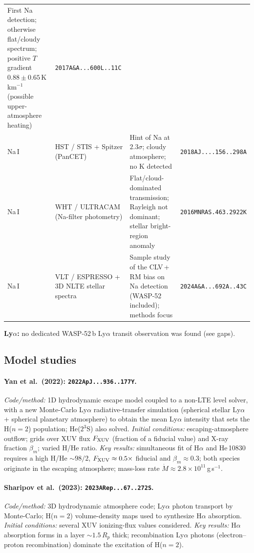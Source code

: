 \begin{longtable}{@{}p{2.0cm} p{2.8cm} p{5.3cm} p{2.9cm}@{}}
First Na detection; otherwise flat/cloudy spectrum; positive $T$ gradient
$0.88\pm0.65$\,K\,km$^{-1}$ (possible upper-atmosphere heating) &
{\footnotesize\texttt{2017A\&A...600L..11C}} \\
Na\,I & HST / STIS + Spitzer (PanCET) &
Hint of Na at $2.3\sigma$; cloudy atmosphere; no K detected &
{\footnotesize\texttt{2018AJ....156..298A}} \\
Na\,I & WHT / ULTRACAM (Na-filter photometry) &
Flat/cloud-dominated transmission; Rayleigh not dominant; stellar bright-region anomaly &
{\footnotesize\texttt{2016MNRAS.463.2922K}} \\
Na\,I & VLT / ESPRESSO + 3D NLTE stellar spectra &
Sample study of the CLV\,+\,RM bias on Na detection (WASP-52 included); methods focus &
{\footnotesize\texttt{2024A\&A...692A..43C}} \\
\bottomrule
\end{longtable}

\noindent\textbf{Ly$\alpha$:} no dedicated WASP-52\,b Ly$\alpha$ transit
observation was found (see gaps).

\subsection{Model studies}

\paragraph{Yan et al.\ (2022): \texttt{2022ApJ...936..177Y}.}
\emph{Code/method:} 1D hydrodynamic escape model coupled to a non-LTE level solver,
with a new Monte-Carlo Ly$\alpha$ radiative-transfer simulation (spherical stellar
Ly$\alpha$ + spherical planetary atmosphere) to obtain the mean Ly$\alpha$ intensity
that sets the H($n{=}2$) population; He($2^3$S) also solved.
\emph{Initial conditions:} escaping-atmosphere outflow; grids over XUV flux
$F_{\rm XUV}$ (fraction of a fiducial value) and X-ray fraction $\beta_m$; varied H/He
ratio.
\emph{Key results:} simultaneous fit of H$\alpha$ and He\,10830 requires a high H/He
$\sim98/2$, $F_{\rm XUV}\approx0.5\times$ fiducial and $\beta_m\approx0.3$; both species
originate in the escaping atmosphere; mass-loss rate
$\dot M\approx2.8\times10^{11}$\,g\,s$^{-1}$.

\paragraph{Sharipov et al.\ (2023): \texttt{2023ARep...67..272S}.}
\emph{Code/method:} 3D hydrodynamic atmosphere code; Ly$\alpha$ photon transport by
Monte-Carlo; H($n{=}2$) volume-density maps used to synthesize H$\alpha$ absorption.
\emph{Initial conditions:} several XUV ionizing-flux values considered.
\emph{Key results:} H$\alpha$ absorption forms in a layer $\sim1.5\,R_p$ thick;
recombination Ly$\alpha$ photons (electron--proton recombination) dominate the
excitation of H($n{=}2$).

